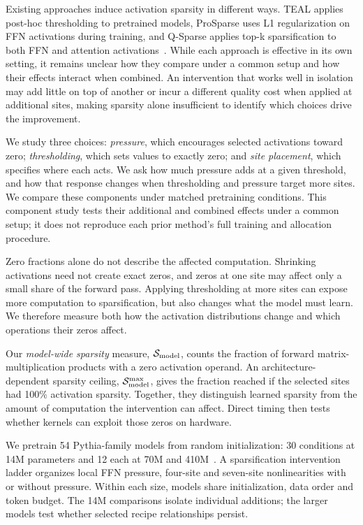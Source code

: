 Existing approaches induce activation sparsity in different ways. TEAL applies post-hoc thresholding to pretrained models, ProSparse uses L1 regularization on FFN activations during training, and Q-Sparse applies top-k sparsification to both FFN and attention activations~\citep{liu2024teal,song2024prosparse,wang2024qsparse}. While each approach is effective in its own setting, it remains unclear how they compare under a common setup and how their effects interact when combined. An intervention that works well in isolation may add little on top of another or incur a different quality cost when applied at additional sites, making sparsity alone insufficient to identify which choices drive the improvement.


We study three choices: \emph{pressure}, which encourages selected activations
toward zero; \emph{thresholding}, which sets values to exactly zero; and
\emph{site placement}, which specifies where each acts. We ask how much
pressure adds at a given threshold, and how that response changes when thresholding
and pressure target more sites. We compare these components under matched
pretraining conditions. This component study tests their additional and
combined effects under a common setup; it does not reproduce each prior
method's full training and allocation procedure.

Zero fractions alone do not describe the affected computation. Shrinking
activations need not create exact zeros, and zeros at one site may affect
only a small share of the forward pass. Applying thresholding at more sites can
expose more computation to sparsification, but also changes what the model
must learn. We therefore measure both how the activation distributions change
and which operations their zeros affect.

Our \emph{model-wide sparsity} measure, $\mathcal{S}_{\mathrm{model}}$, counts the fraction of
forward matrix-multiplication products with a zero activation operand.
An architecture-dependent sparsity ceiling, $\mathcal{S}_{\mathrm{model}}^{\max}$, gives the fraction reached
if the selected sites had 100\% activation sparsity. Together, they distinguish learned
sparsity from the amount of computation the intervention can affect. Direct
timing then tests whether kernels can exploit those zeros on hardware.

We pretrain 54 Pythia-family models from random initialization: 30 conditions
at 14M parameters and 12 each at 70M and 410M~\citep{biderman2023pythia}.
A sparsification intervention ladder organizes local FFN pressure, four-site
and seven-site nonlinearities with or without pressure. Within each size, models
share initialization, data order and token budget. The 14M comparisons isolate
individual additions; the larger models test whether selected recipe
relationships persist.

